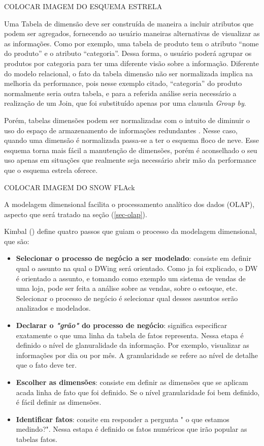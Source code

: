 COLOCAR IMAGEM DO ESQUEMA ESTRELA

%

Uma Tabela de dimensão deve ser construída de maneira a incluir atributos que podem ser agregados, fornecendo ao usuário maneiras alternativas de visualizar as as informações. Como por exemplo, uma tabela de produto tem o atributo “nome do produto” e o atributo “categoria”. Dessa forma, o usuário poderá agrupar os produtos por categoria para ter uma diferente visão sobre a informação. Diferente do modelo relacional, o fato da tabela dimensão não ser normalizada implica na melhoria da performance, pois nesse exemplo citado, “categoria” do produto normalmente seria outra tabela, e para a referida análise seria necessário a realização de um Join, que foi substituído apenas por uma clausula \emph{Group by}.

%

Porém, tabelas dimensões podem ser normalizadas com o intuito de diminuir o uso do espaço de armazenamento de informações redundantes \cite{kimball2002}. Nesse caso, quando uma dimensão é normalizada passa-se a ter o esquema floco de neve. Esse esquema torna mais fácil a manutenção de dimensões, porém é aconselhado o seu uso apenas em situações que realmente seja necessário abrir mão da performance que o esquema estrela oferece.

COLOCAR IMAGEM DO SNOW FLAck

%

A modelagem dimensional facilita o processamento analítico dos dados (OLAP), aspecto que será tratado na seção (\ref{sec-olap}).

%

 Kimbal (\citeyear{kimball2002}) define quatro passos que guiam o processo da modelagem dimensional, que são:


 \begin{itemize}
 	\item \textbf{Selecionar o processo de negócio a ser modelado}: consiste em definir qual o assunto na qual o DWing será orientado. Como ja foi explicado, o DW é orientado a assunto, e tomando como exemplo um sistema de vendas de uma loja, pode ser feita a análise sobre as vendas, sobre o estoque, etc. Selecionar o processo de negócio é selecionar qual desses assuntos serão analizados e modelados.
 	\item \textbf{Declarar o \emph{"grão"} do processo de negócio}: significa especificar exatamente o que uma linha da tabela de fatos representa. Nessa etapa é definido o nível de glanuralidade da informação. Por exemplo, visualizar as informações por dia ou por mês. A granularidade se refere ao nível de detalhe que o fato deve ter. 
 	\item \textbf{Escolher as dimensões}: consiste em definir as dimensões que se aplicam acada linha de fato que foi definido. Se o nível granularidade foi bem definido, é fácil definir as dimensões. 
 	\item \textbf{Identificar fatos}: consite em responder a pergunta "	o que estamos medindo?". Nessa estapa é definido os fatos numéricos que irão popular as tabelas fatos.	  
 \end{itemize}

